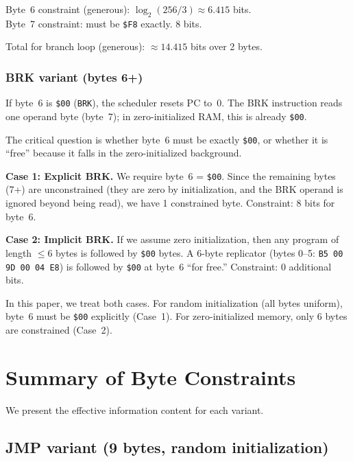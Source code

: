 \documentclass{article}
\newcommand{\hex}[1]{\texttt{\$#1}}
\newcommand{\opcode}[1]{\texttt{#1}}
\begin{document}
Byte~6 constraint (generous): $\log_2(256/3) \approx 6.415$ bits.\\
Byte~7 constraint: must be \hex{F8} exactly. 8 bits.

Total for branch loop (generous): $\approx 14.415$ bits over 2 bytes.

\subsubsection{BRK variant (bytes 6+)}
\label{sec:brk}

If byte~6 is \hex{00} (\opcode{BRK}), the scheduler resets PC to~0.
The BRK instruction reads one operand byte (byte~7); in
zero-initialized RAM, this is already \hex{00}.

The critical question is whether byte~6 must be exactly \hex{00}, or
whether it is ``free'' because it falls in the zero-initialized
background.

\textbf{Case 1: Explicit BRK.} We require byte~6 = \hex{00}. Since
the remaining bytes (7+) are unconstrained (they are zero by
initialization, and the BRK operand is ignored beyond being read),
we have 1 constrained byte.
Constraint: 8 bits for byte~6.

\textbf{Case 2: Implicit BRK.} If we assume zero initialization, then
any program of length $\le 6$ bytes is followed by \hex{00} bytes.
A 6-byte replicator (bytes 0--5: \texttt{B5 00 9D 00 04 E8}) is
followed by \hex{00} at byte~6 ``for free.''
Constraint: 0 additional bits.

In this paper, we treat both cases. For random initialization (all
bytes uniform), byte~6 must be \hex{00} explicitly (Case~1). For
zero-initialized memory, only 6 bytes are constrained (Case~2).

\section{Summary of Byte Constraints}
\label{sec:summary}

We present the effective information content for each variant.

\subsection{JMP variant (9 bytes, random initialization)}
\end{document}
